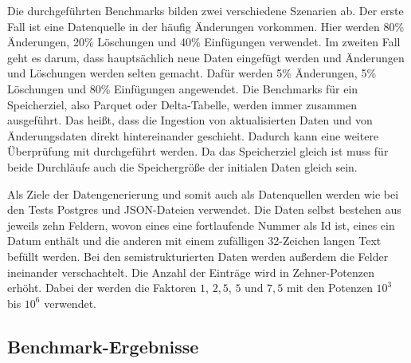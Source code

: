 Die durchgeführten Benchmarks bilden zwei verschiedene Szenarien ab.
Der erste Fall ist eine Datenquelle in der häufig Änderungen vorkommen.
Hier werden 80\% Änderungen, 20\% Löschungen und 40\% Einfügungen verwendet.
Im zweiten Fall geht es darum, dass hauptsächlich neue Daten eingefügt werden und Änderungen und Löschungen werden selten gemacht.
Dafür werden 5\% Änderungen, 5\% Löschungen und 80\% Einfügungen angewendet.
Die Benchmarks für ein Speicherziel, also Parquet oder Delta-Tabelle, werden immer zusammen ausgeführt.
Das heißt, dass die Ingestion von aktualisierten Daten und von Änderungsdaten direkt hintereinander geschieht.
Dadurch kann eine weitere Überprüfung mit durchgeführt werden.
Da das Speicherziel gleich ist muss für beide Durchläufe auch die Speichergröße der initialen Daten gleich sein.

Als Ziele der Datengenerierung und somit auch als Datenquellen werden wie bei den Tests Postgres und JSON-Dateien verwendet.
Die Daten selbst bestehen aus jeweils zehn Feldern, wovon eines eine fortlaufende Nummer als Id ist, eines ein Datum enthält und die anderen mit einem zufälligen 32-Zeichen langen Text befüllt werden.
Bei den semistrukturierten Daten werden außerdem die Felder ineinander verschachtelt.
Die Anzahl der Einträge wird in Zehner-Potenzen erhöht.
Dabei der werden die Faktoren $1$, $2,5$, $5$ und $7,5$ mit den Potenzen $10^3$ bis $10^6$ verwendet.

\subsection{Benchmark-Ergebnisse}

